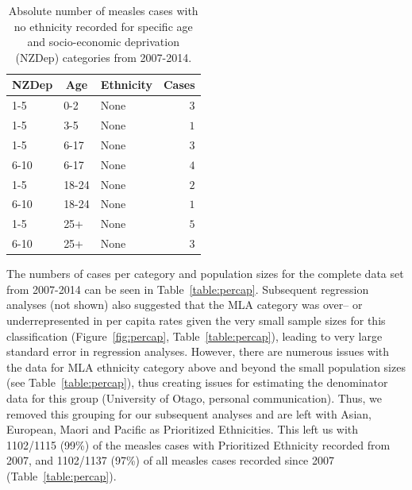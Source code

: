 \documentclass{article}
\begin{document}
\begin{table}[hbtp]
\footnotesize
\begin{center}
\begin{tabular}{lllr}
\hline\hline
\multicolumn{1}{c}{NZDep}&\multicolumn{1}{c}{Age}&\multicolumn{1}{c}{Ethnicity}&\multicolumn{1}{c}{Cases}\tabularnewline
\hline
1-5&0-2&None&$3$\tabularnewline
1-5&3-5&None&$1$\tabularnewline
1-5&6-17&None&$3$\tabularnewline
6-10&6-17&None&$4$\tabularnewline
1-5&18-24&None&$2$\tabularnewline
6-10&18-24&None&$1$\tabularnewline
1-5&25+&None&$5$\tabularnewline
6-10&25+&None&$3$\tabularnewline
\hline
\end{tabular}\end{center}\caption{Absolute number of measles cases with no ethnicity recorded for specific age and socio-economic deprivation (NZDep) categories from 2007-2014.}
\label{table:none}
\end{table}


The numbers of cases per category and population sizes for the complete data set from 2007-2014 can be seen in Table~\autoref{table:percap}. Subsequent regression analyses (not shown) also suggested that the MLA category was over-- or underrepresented in per capita rates given the very small sample sizes for this classification (Figure~\autoref{fig:percap}, Table~\autoref{table:percap}), leading to very large standard error in regression analyses. However, there are numerous issues with the data for MLA ethnicity category above and beyond the small population sizes (see Table~\autoref{table:percap}), thus creating issues for estimating the denominator data for this group (University of Otago, personal communication). Thus, we removed this grouping for our subsequent analyses and are left with Asian, European, Maori and Pacific as Prioritized Ethnicities. This left us with 1102/1115 (99\%) of the measles cases with Prioritized Ethnicity recorded from 2007, and 1102/1137 (97\%) of all measles cases recorded since 2007 (Table~\autoref{table:percap}).
\end{document}
